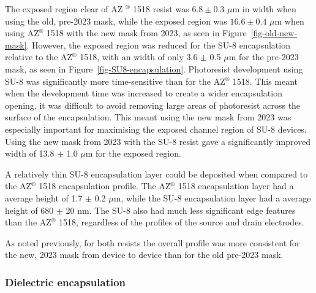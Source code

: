\documentclass[
  a4paper,
]{scrbook}
\begin{document}
The exposed region clear of AZ \(^\circledR\) 1518 resist was
\(6.8 \pm 0.3\) \(\mu\)m in width when using the old, pre-2023 mask,
while the exposed region was \(16.6 \pm 0.4\) \(\mu\)m when using
AZ\(^\circledR\) 1518 with the new mask from 2023, as seen in
Figure~\ref{fig-old-new-mask}. However, the exposed region was reduced
for the SU-8 encapsulation relative to the AZ\(^\circledR\) 1518, with
an width of only 3.6 \(\pm\) 0.5 \(\mu\)m for the pre-2023 mask, as seen
in Figure~\ref{fig-SU8-encapsulation}. Photoresist development using
SU-8 was significantly more time-sensitive than for the AZ\(^\circledR\)
1518. This meant when the development time was increased to create a
wider encapsulation opening, it was difficult to avoid removing large
areas of photoresist across the surface of the encapsulation. This meant
using the new mask from 2023 was especially important for maximising the
exposed channel region of SU-8 devices. Using the new mask from 2023
with the SU-8 resist gave a significantly improved width of 13.8 \(\pm\)
1.0 \(\mu\)m for the exposed region.

A relatively thin SU-8 encapsulation layer could be deposited when
compared to the AZ\(^\circledR\) 1518 encapsulation profile. The
AZ\(^\circledR\) 1518 encapsulation layer had a average height of 1.7
\(\pm\) 0.2 \(\mu\)m, while the SU-8 encapsulation layer had a average
height of 680 \(\pm\) 20 nm. The SU-8 also had much less significant
edge features than the AZ\(^\circledR\) 1518, regardless of the profiles
of the source and drain electrodes.

As noted previously, for both resists the overall profile was more
consistent for the new, 2023 mask from device to device than for the old
pre-2023 mask.

\hypertarget{dielectric-encapsulation}{%
\subsubsection*{Dielectric
encapsulation}\label{dielectric-encapsulation}}
\end{document}
